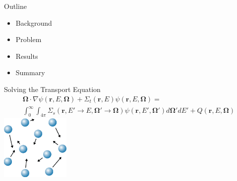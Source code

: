 \documentclass{beamer}
\newcommand{\bo}{\mathbf\Omega}
\newcommand{\vecr}{\textbf{r}}
\begin{document}
\begin{frame}{Outline}
  \begin{itemize}
  \item{Background}
  \item{Problem}
  \item{Results}
  \item{Summary}
  \end{itemize}
\end{frame}

\begin{frame}{Solving the Transport Equation}
%
\begin{multline*}
\bo \cdot \nabla \psi(\vecr,E,\bo) + \Sigma_t(\vecr,E) \psi(\vecr,E,\bo) = \\
\int_0^\infty\int_{4\pi} \Sigma_s(\vecr,E'\rightarrow E,\bo'\rightarrow\bo)
\psi(\vecr,E',\bo')d\bo'dE' + Q(\vecr,E,\bo)
\end{multline*}
%
\pause
%
\center
\includegraphics[width=0.25\textwidth,natwidth=212,natheight=200]{img/particles.png}
%
%
\end{frame}
\end{document}
